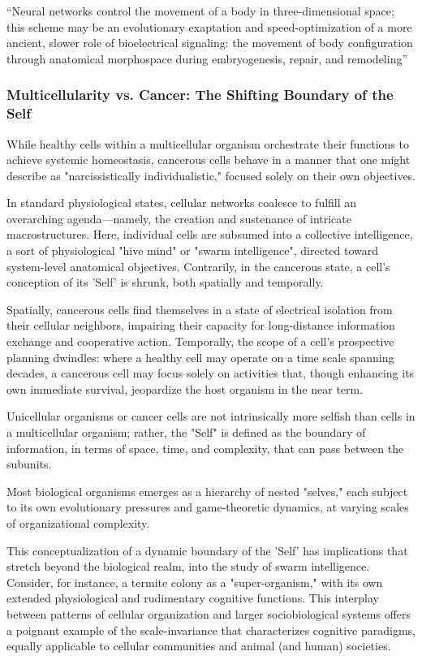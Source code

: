 “Neural networks control the movement of a body in three-dimensional space; this scheme may be an evolutionary exaptation and speed-optimization of a more ancient, slower role of bioelectrical signaling: the movement of body configuration through anatomical morphospace during embryogenesis, repair, and remodeling”





\subsubsection{Multicellularity vs. Cancer: The Shifting Boundary of the Self}

While healthy cells within a multicellular organism orchestrate their functions to achieve systemic homeostasis, cancerous cells behave in a manner that one might describe as "narcissistically individualistic," focused solely on their own objectives.

In standard physiological states, cellular networks coalesce to fulfill an overarching agenda—namely, the creation and sustenance of intricate macrostructures. Here, individual cells are subsumed into a collective intelligence, a sort of physiological "hive mind" or "swarm intelligence", directed toward system-level anatomical objectives. Contrarily, in the cancerous state, a cell's conception of its 'Self' is shrunk, both spatially and temporally.

Spatially, cancerous cells find themselves in a state of electrical isolation from their cellular neighbors, impairing their capacity for long-distance information exchange and cooperative action. Temporally, the scope of a cell's prospective planning dwindles: where a healthy cell may operate on a time scale spanning decades, a cancerous cell may focus solely on activities that, though enhancing its own immediate survival, jeopardize the host organism in the near term.

Unicellular organisms or cancer cells are not intrinsically more selfish than cells in a multicellular organism; rather, the "Self" is defined as the boundary of information, in terms of space, time, and complexity, that can pass between the subunits. 

Most biological organisms emerges as a hierarchy of nested "selves," each subject to its own evolutionary pressures and game-theoretic dynamics, at varying scales of organizational complexity.

This conceptualization of a dynamic boundary of the 'Self' has implications that stretch beyond the biological realm, into the study of swarm intelligence. Consider, for instance, a termite colony as a "super-organism," with its own extended physiological and rudimentary cognitive functions. This interplay between patterns of cellular organization and larger sociobiological systems offers a poignant example of the scale-invariance that characterizes cognitive paradigms, equally applicable to cellular communities and animal (and human) societies.

